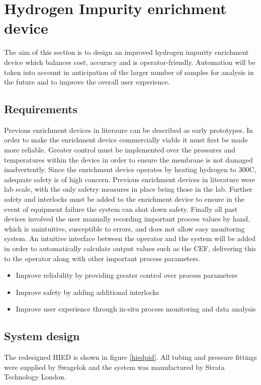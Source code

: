 \section{Hydrogen Impurity enrichment device}
The aim of this section is to design an improved hydrogen impurity enrichment device which balances cost, accuracy and is operator-friendly. Automation will be taken into account in anticipation of the larger number of samples for analysis in the future and to improve the overall user experience. 
\subsection{Requirements}
Previous enrichment devices in literaure can be described as early prototypes.\cite{Ahmed2010} \cite{Murugan2014} In order to make the enrichment device commercially viable it must first be made more reliable. Greater control must be implemented over the pressures and temperatures within the device in order to ensure the membrane is not damaged inadvertently. Since the enrichment device operates by heating hydrogen to 300\textdegree C, adequate safety is of high concern. Previous enrichment devices in literature were lab scale, with the only safetry measures in place being those in the lab. Further safety and interlocks must be added to the enrichment device to ensure in the event of equipment failure the system can shut down safety. Finally all past devices involved the user manually recording important process values by hand, which is unintuitive, susceptible to errors, and does not allow easy monitoring system. An intuitive interface between the operator and the system will be added in order to automatically calculate output values such as the CEF, delivering this to the operator along with other important process parameters. 

\begin{itemize}
    \item Improve reliability by providing greater control over process parameters
    \item Improve safety by adding additional interlocks
    \item Improve user experience through in-situ process monitoring and data analysis
\end{itemize}

\subsection{System design}
The redesigned HIED is shown in figure \ref{hiedpid}. All tubing and pressure fittings were supplied by Swagelok \cite{swagelok} and the system was manufactured by Strata Technology London. \cite{stratatechnology}

